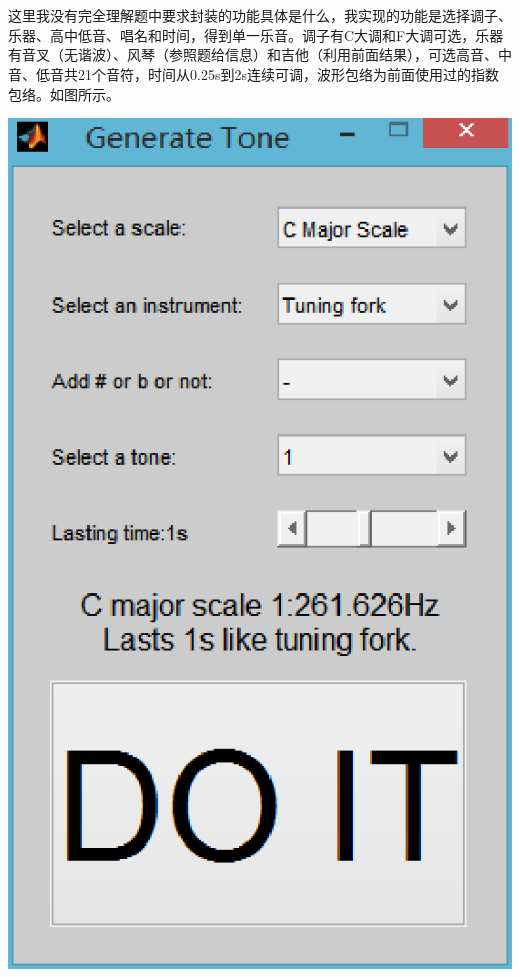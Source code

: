 \section{}
\noindent{}
\par
这里我没有完全理解题中要求封装的功能具体是什么，我实现的功能是选择调子、乐器、高中低音、唱名和时间，得到单一乐音。调子有C大调和F大调可选，乐器有音叉（无谐波）、风琴（参照题给信息）和吉他（利用前面结果），可选高音、中音、低音共21个音符，时间从0.25s到2s连续可调，波形包络为前面使用过的指数包络。如图所示。
\begin{center}
   \includegraphics{A1_c.eps}
\end{center}

